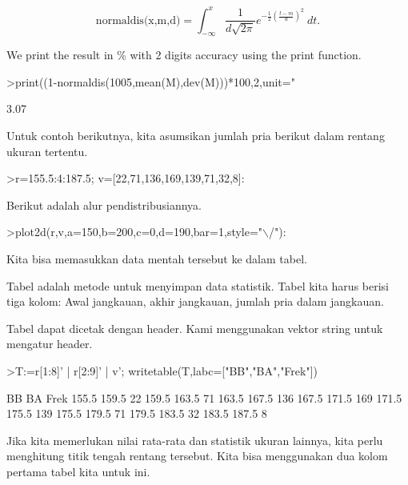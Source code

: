 \documentclass[a4paper,10pt]{article}
\begin{document}
\begin{eulernotebook}
\begin{eulercomment}
\begin{eulercomment}
\begin{eulercomment}
\end{eulercomment}
\begin{eulerformula}
\[
\text{normaldis(x,m,d)}=\int_{-\infty}^x \frac{1}{d\sqrt{2\pi}}e^{-\frac{1}{2}(\frac{t-m}{d})^2}\ dt.
\]
\end{eulerformula}
\begin{eulercomment}
We print the result in \% with 2 digits accuracy using the print function.
\end{eulercomment}
\begin{eulerprompt}
>print((1-normaldis(1005,mean(M),dev(M)))*100,2,unit=" %
\end{eulerprompt}
\begin{euleroutput}
        3.07 %
\end{euleroutput}
\begin{eulercomment}
Untuk contoh berikutnya, kita asumsikan jumlah pria berikut dalam
rentang ukuran tertentu.
\end{eulercomment}
\begin{eulerprompt}
>r=155.5:4:187.5; v=[22,71,136,169,139,71,32,8]:
\end{eulerprompt}
\begin{eulercomment}
Berikut adalah alur pendistribusiannya.
\end{eulercomment}
\begin{eulerprompt}
>plot2d(r,v,a=150,b=200,c=0,d=190,bar=1,style="\(\backslash\)/"):
\end{eulerprompt}
\begin{eulercomment}
Kita bisa memasukkan data mentah tersebut ke dalam tabel.

Tabel adalah metode untuk menyimpan data statistik. Tabel kita harus
berisi tiga kolom: Awal jangkauan, akhir jangkauan, jumlah pria dalam
jangkauan.

Tabel dapat dicetak dengan header. Kami menggunakan vektor string
untuk mengatur header.
\end{eulercomment}
\begin{eulerprompt}
>T:=r[1:8]' | r[2:9]' | v'; writetable(T,labc=["BB","BA","Frek"])
\end{eulerprompt}
\begin{euleroutput}
          BB        BA      Frek
       155.5     159.5        22
       159.5     163.5        71
       163.5     167.5       136
       167.5     171.5       169
       171.5     175.5       139
       175.5     179.5        71
       179.5     183.5        32
       183.5     187.5         8
\end{euleroutput}
\begin{eulercomment}
Jika kita memerlukan nilai rata-rata dan statistik ukuran lainnya,
kita perlu menghitung titik tengah rentang tersebut. Kita bisa
menggunakan dua kolom pertama tabel kita untuk ini.


\end{eulercomment}
\end{eulercomment}
\end{eulercomment}
\end{eulernotebook}
\end{document}
